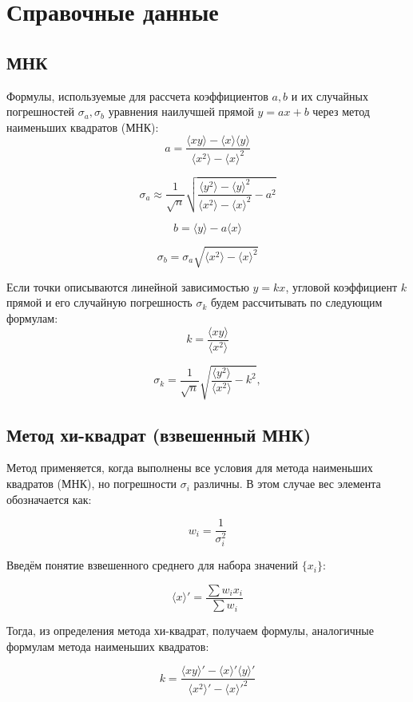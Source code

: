 \section{Справочные данные}

\subsection{МНК}

Формулы, используемые для рассчета коэффициентов $a, b$ и их случайных погрешностей $\sigma_a, \sigma_b$ уравнения наилучшей прямой $y = ax+ b$ через метод наименьших квадратов (МНК):
$$
    a = \frac{\langle xy \rangle - \langle x \rangle \langle y \rangle}{\langle x^2 \rangle - \langle x \rangle ^2}
$$

$$
    \sigma_a \approx \frac{1}{\sqrt{n}} \sqrt{\frac{\langle y^2 \rangle - \langle y \rangle^2}{\langle x^2 \rangle - \langle x \rangle^2} - a^2}
$$

$$
    b = \langle y \rangle - a \langle x \rangle
$$

$$
    \sigma_b = \sigma_a \sqrt{\langle x^2 \rangle - \langle x \rangle^2}
$$

Если точки описываются линейной зависимостью $y = kx$, угловой коэффициент $k$ прямой и его случайную погрешность $\sigma_k$ будем рассчитывать по следующим формулам:
$$
    k = \frac{\langle xy \rangle}{\langle x^2 \rangle}
$$

$$
    \sigma_k = \frac{1}{\sqrt{n}} \sqrt{\frac{\langle y^2 \rangle}{\langle x^2 \rangle} - k^2},
$$

\subsection{Метод хи-квадрат (взвешенный МНК)}

Метод применяется, когда выполнены все условия для метода наименьших квадратов (МНК), но погрешности $\sigma_i$ различны. В этом случае вес элемента обозначается как:

\[
w_i = \dfrac{1}{\sigma_i^2}
\]

Введём понятие взвешенного среднего для набора значений $\{x_i\}$:

\[
\langle x \rangle' = \dfrac{\sum w_i x_i}{\sum w_i}
\]

Тогда, из определения метода хи-квадрат, получаем формулы, аналогичные формулам метода наименьших квадратов:

\[
k = \dfrac{\langle xy \rangle' - \langle x \rangle' \langle y \rangle'}{\langle x^2 \rangle' - \langle x \rangle'^2}
\]

